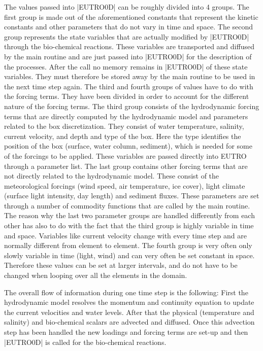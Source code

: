 The values passed into |EUTRO0D| can be roughly divided into 4 
groups. The first group is made out of the aforementioned constants 
that represent the kinetic constants and other parameters that 
do not vary in time and space. The second group represents the 
state variables that are actually modified by |EUTRO0D| through 
the bio-chemical reactions. These variables are transported and 
diffused by the main routine and are just passed into |EUTRO0D| 
for the description of the processes. After the call no memory 
remains in |EUTRO0D| of these state variables. They must therefore 
be stored away by the main routine to be used in the next time 
step again. The third and fourth groups of values have to do 
with the forcing terms. They have been divided in order to account 
for the different nature of the forcing terms. The third group 
consists of the hydrodynamic forcing terms that are directly 
computed by the hydrodynamic model and parameters related to 
the box discretization. They consist of water temperature, salinity, 
current velocity, and depth and type of the box. Here the type 
identifies the position of the box (surface, water column, sediment), 
which is needed for some of the forcings to be applied. These 
variables are passed directly into EUTRO through a parameter 
list. The last group contains other forcing terms that are not 
directly related to the hydrodynamic model. These consist of 
the meteorological forcings (wind speed, air temperature, ice 
cover), light climate (surface light intensity, day length) and 
sediment fluxes. These parameters are set through a number of 
commodity functions that are called by the main routine. The 
reason why the last two parameter groups are handled differently 
from each other has also to do with the fact that the third group 
is highly variable in time and space. Variables like current 
velocity change with every time step and are normally different 
from element to element. The fourth group is very often only 
slowly variable in time (light, wind) and can very often be set 
constant in space. Therefore these values can be set at larger 
intervals, and do not have to be changed when looping over all 
the elements in the domain.

The overall flow of information during one time step is the following: 
First the hydrodynamic model resolves the momentum and continuity 
equation to update the current velocities and water levels. After 
that the physical (temperature and salinity) and bio-chemical 
scalars are advected and diffused. Once this advection step has 
been handled the new loadings and forcing terms are set-up and 
then |EUTRO0D| is called for the bio-chemical reactions. 


